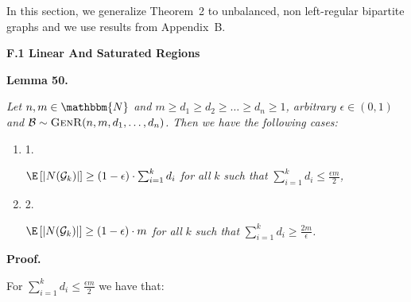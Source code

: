\documentclass[10pt,a4paper]{article}
\begin{document}
In this section, we generalize Theorem 2 to unbalanced, non left-regular bipartite graphs and we use results from Appendix B.\par




\par\medskip\noindent\textbf{F.1 Linear And Saturated Regions}\par





\par\medskip\noindent\textbf{\textbf{Lemma 50}\textbf{.}}\par



\emph{Let $n,m\in\mathbbm{N}$ and $m\geq d_{1}\geq d_{2}\geq\dots\geq d_{n}\geq 1$, arbitrary $\epsilon\in(0,1)$ and $\mathcal{B}\sim\textsc{GenR}(n,m,d_{1},\dots,d_{n})$.
Then we have the following cases:}\par


\begin{enumerate}


\item[] 1. 


$\E\left[|N(\mathcal{G}_{k})|\right]\geq\left(1-\epsilon\right)\cdot\sum_{i=1}^{k}d_{i}$\emph{ for all }$k$\emph{ such that }$\sum_{i=1}^{k}d_{i}\leq\frac{\epsilon m}{2}$\emph{,}\par




\item[] 2. 


$\E\left[|N(\mathcal{G}_{k})|\right]\geq\left(1-\epsilon\right)\cdot m$\emph{ for all }$k$\emph{ such that }$\sum_{i=1}^{k}d_{i}\geq\frac{2m}{\epsilon}$\emph{.}\par




\end{enumerate}






\par\medskip\noindent\textbf{Proof.}\par



For $\sum_{i=1}^{k}d_{i}\leq\frac{\epsilon m}{2}$ we have that:\par
\end{document}
